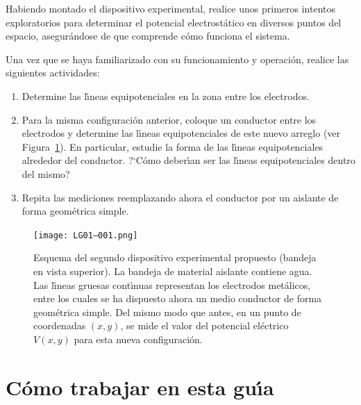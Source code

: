 \documentclass[laboratorio]{guia}
\begin{document}
Habiendo montado el dispositivo experimental, realice unos primeros intentos
exploratorios para determinar el potencial electrost\'atico en diversos puntos
del espacio, asegur\'andose de que comprende c\'omo funciona el sistema. 

Una vez que se haya familiarizado con su funcionamiento y operaci\'on, realice
las siguientes actividades:
\begin{enumerate}
    \item Determine las l\'\i neas equipotenciales en la zona entre los electrodos.
    \item Para la misma configuraci\'on anterior, coloque un conductor entre los 
        electrodos y determine las l\'\i neas equipotenciales de este nuevo 
        arreglo (ver Figura~\ref{fig:2}). En particular, estudie la forma de las  l\'\i neas 
        equipotenciales alrededor del conductor. ?`C\'omo deber\'\i an ser las 
        l\'\i neas equipotenciales dentro del mismo?  
    \item Repita las mediciones reemplazando ahora el conductor por un aislante de forma
        geom\'etrica simple.
\end{enumerate}


\begin{figure}[t!]
    \centering
\texttt{[image: LG01--001.png]}
\caption{Esquema del segundo dispositivo experimental propuesto (bandeja en vista
superior). La bandeja de material aislante contiene agua. Las l\'\i neas
gruesas cont\'\i nuas representan los electrodos met\'alicos, entre los cuales
se ha dispuesto ahora un medio conductor de forma geom\'etrica simple. Del mismo
modo que antes, en un punto
de coordenadas $(x,y)$, se mide el valor del potencial el\'ectrico $V(x,y)$
para esta nueva configuraci\'on.}
    \label{fig:2}
\end{figure}

\section{C\'omo trabajar en esta gu\'\i a}
\end{document}
